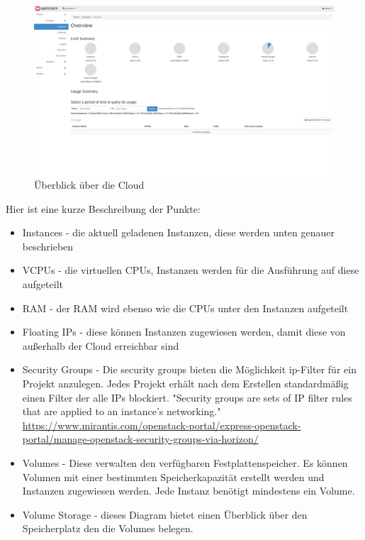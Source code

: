 \documentclass[a4paper,10pt]{article}
\numberwithin{figure}{section}
\numberwithin{table}{section}
\begin{document}
\begin{figure}[htbp]
\centering
\caption{Überblick über die Cloud}
\label{fig:devstack:overview}
\includegraphics[width=\textwidth, trim={0 5cm 0 0}, clip]{graphics/devstack/01_Overview}
\end{figure}

\begin{minipage}{\textwidth}
Hier ist eine kurze Beschreibung der Punkte:
\begin{itemize}
 \item Instances - die aktuell geladenen Instanzen, diese werden unten genauer beschrieben
 \item VCPUs - die virtuellen CPUs, Instanzen werden für die Ausführung auf diese aufgeteilt
 \item RAM - der RAM wird ebenso wie die CPUs unter den Instanzen aufgeteilt
 \item Floating IPs - diese können Instanzen zugewiesen werden, damit diese von außerhalb der Cloud erreichbar sind
 \item Security Groups - Die security groups bieten die Möglichkeit ip-Filter für ein Projekt anzulegen. Jedes Projekt erhält nach dem Erstellen standardmäßig einen Filter der alle IPs blockiert. "Security groups are sets of IP filter rules that are applied to an instance’s networking." \url{https://www.mirantis.com/openstack-portal/express-openstack-portal/manage-openstack-security-groups-via-horizon/}
 \item Volumes - Diese verwalten den verfügbaren Festplattenspeicher. Es können Volumen mit einer bestimmten Speicherkapazität erstellt werden und Instanzen zugewiesen werden. Jede Instanz benötigt mindestens ein Volume.
 \item Volume Storage - dieses Diagram bietet einen Überblick über den Speicherplatz den die Volumes belegen.
\end{itemize}
\end{minipage}
\end{document}
